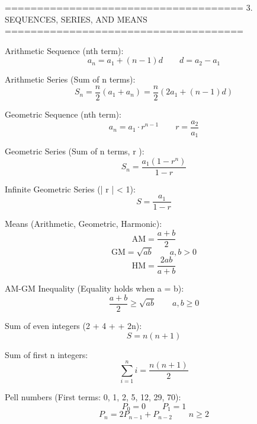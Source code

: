 =====================================
3. SEQUENCES, SERIES, AND MEANS
=====================================

Arithmetic Sequence (nth term):
$$a_n = a_1 + (n-1)d \qquad d = a_2 - a_1$$

Arithmetic Series (Sum of n terms):
$$S_n = \frac{n}{2}(a_1 + a_n) = \frac{n}{2}\left(2a_1 + (n-1)d\right)$$

Geometric Sequence (nth term):
$$a_n = a_1 \cdot r^{n-1} \qquad r = \frac{a_2}{a_1}$$

Geometric Series (Sum of n terms, r ):
$$S_n = \frac{a_1(1 - r^n)}{1 - r}$$

Infinite Geometric Series (\left| r \right| < 1):
$$S = \frac{a_1}{1 - r}$$

Means (Arithmetic, Geometric, Harmonic):
$$\text{AM} = \frac{a + b}{2}$$
$$\text{GM} = \sqrt{ab} \qquad a, b > 0$$
$$\text{HM} = \frac{2ab}{a + b}$$

AM-GM Inequality (Equality holds when a = b):
$$\frac{a + b}{2} \ge \sqrt{ab} \qquad a, b \ge 0$$

Sum of even integers (2 + 4 + \cdot \cdot \cdot + 2n):
$$S = n(n + 1)$$

Sum of first n integers:
$$\sum_{i=1}^n i = \frac{n(n+1)}{2}$$

Pell numbers (First terms: 0, 1, 2, 5, 12, 29, 70):
$$P_0 = 0 \qquad P_1 = 1$$
$$P_n = 2P_{n-1} + P_{n-2} \qquad n \ge 2$$
